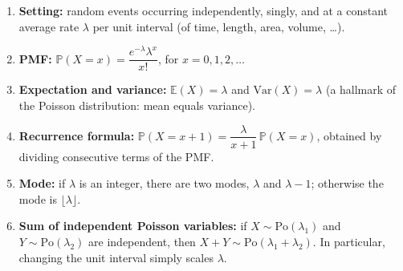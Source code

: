 \documentclass[11pt]{article}
\begin{document}
\begin{methode}
\begin{enumerate}
\item \textbf{Setting:} random events occurring independently, singly, and at a constant average rate $\lambda$ per unit interval (of time, length, area, volume, \dots).
\item \textbf{PMF:} $\mathbb{P}(X = x) = \dfrac{e^{-\lambda} \lambda^x}{x!}$, for $x = 0,1,2,\dots$
\item \textbf{Expectation and variance:} $\mathbb{E}(X) = \lambda$ and $\mathrm{Var}(X) = \lambda$ (a hallmark of the Poisson distribution: mean equals variance).
\item \textbf{Recurrence formula:} $\mathbb{P}(X = x+1) = \dfrac{\lambda}{x+1}\,\mathbb{P}(X = x)$, obtained by dividing consecutive terms of the PMF.
\item \textbf{Mode:} if $\lambda$ is an integer, there are two modes, $\lambda$ and $\lambda - 1$; otherwise the mode is $\lfloor \lambda \rfloor$.
\item \textbf{Sum of independent Poisson variables:} if $X \sim \mathrm{Po}(\lambda_1)$ and $Y \sim \mathrm{Po}(\lambda_2)$ are independent, then $X+Y \sim \mathrm{Po}(\lambda_1 + \lambda_2)$. In particular, changing the unit interval simply scales $\lambda$.
\end{enumerate}
\end{methode}
\end{document}
